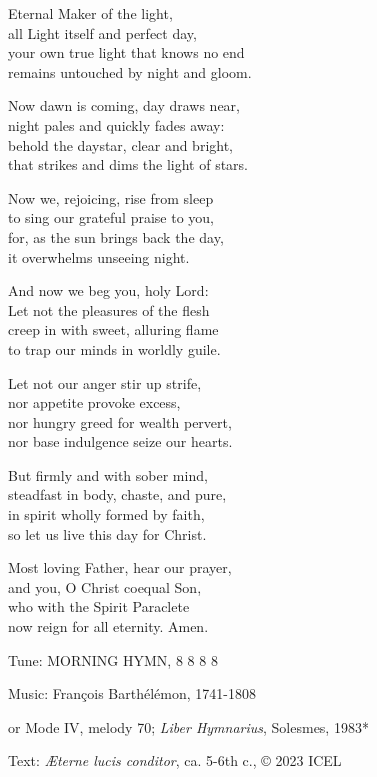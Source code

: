 \hymn

\begin{hymnverse}
Eternal Maker of the light,\\
all Light itself and perfect day,\\
your own true light that knows no end\\
remains untouched by night and gloom.

Now dawn is coming, day draws near,\\
night pales and quickly fades away:\\
behold the daystar, clear and bright,\\
that strikes and dims the light of stars.

Now we, rejoicing, rise from sleep\\
to sing our grateful praise to you,\\
for, as the sun brings back the day,\\
it overwhelms unseeing night.

And now we beg you, holy Lord:\\
Let not the pleasures of the flesh\\
creep in with sweet, alluring flame\\
to trap our minds in worldly guile.

Let not our anger stir up strife,\\
nor appetite provoke excess,\\
nor hungry greed for wealth pervert,\\
nor base indulgence seize our hearts.

But firmly and with sober mind,\\
steadfast in body, chaste, and pure,\\
in spirit wholly formed by faith,\\
so let us live this day for Christ.

Most loving Father, hear our prayer,\\
and you, O Christ coequal Son,\\
who with the Spirit Paraclete\\
now reign for all eternity. Amen.
\end{hymnverse}

\begin{hymnsource}
Tune: MORNING HYMN, 8 8 8 8

Music: François Barthélémon, 1741-1808

or Mode IV, melody 70; \emph{Liber Hymnarius}, Solesmes, 1983*

Text: \emph{Æterne lucis conditor}, ca. 5-6th c., © 2023 ICEL
\end{hymnsource}